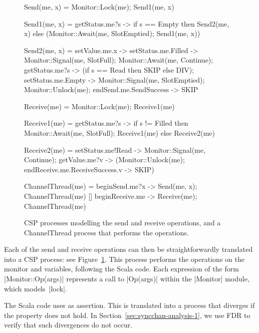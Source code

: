 \begin{figure}
\begin{cspm}
Send(me, x) = Monitor::Lock(me); Send1(me, x)

Send1(me, x) = 
  getStatus.me?s ->
  if s == Empty then Send2(me, x) else (Monitor::Await(me, SlotEmptied); Send1(me, x))

Send2(me, x) = 
  setValue.me.x -> setStatus.me.Filled -> Monitor::Signal(me, SlotFull);	
  Monitor::Await(me, Continue); 
  getStatus.me?s -> (if s == Read then SKIP else DIV);
  setStatus.me.Empty -> Monitor::Signal(me, SlotEmptied);
  Monitor::Unlock(me); endSend.me.SendSuccess -> SKIP

Receive(me) = Monitor::Lock(me); Receive1(me)

Receive1(me) =
  getStatus.me?s -> 
  if s != Filled then Monitor::Await(me, SlotFull); Receive1(me) else Receive2(me)

Receive2(me) = 
  setStatus.me!Read -> Monitor::Signal(me, Continue); 
  getValue.me?v -> (Monitor::Unlock(me); endReceive.me.ReceiveSuccess.v -> SKIP) 

ChannelThread(me) = 
  beginSend.me?x -> Send(me, x); ChannelThread(me)
  [] beginReceive.me -> Receive(me); ChannelThread(me)
\end{cspm}
\caption{CSP processes modelling the {\scalashape send} and {\scalashape
    receive} operations, and a {\scalashape ChannelThread} process that
  performs the operations.}
\label{fig:CSP-send-receive}
\end{figure}


Each of the send and receive operations can then be straightforwardly
translated into a CSP process: see Figure~\ref{fig:CSP-send-receive}.  This
process performs the operations on the monitor and variables, following the
Scala code.  Each expression of the form |Monitor::Op(args)| represents a call
to |Op(args)| within the |Monitor| module, which models~|lock|.



The Scala code uses as assertion.  This is translated into a process that
diverges if the property does not hold.  In
Section~\ref{sec:syncchan-analysis-1}, we use FDR to verify that such
divergences do not occur.

